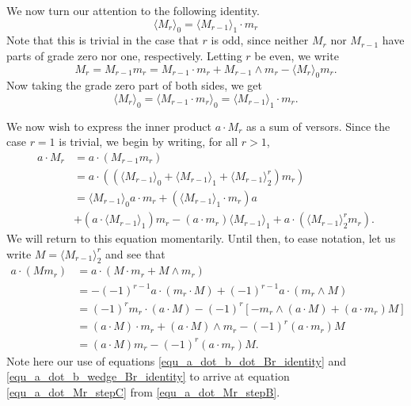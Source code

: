\documentclass{birkjour}
\theoremstyle{definition}
\theoremstyle{remark}
\numberwithin{equation}{section}
\begin{document}
We now turn our attention to the following identity.
\begin{equation}\label{equ_gr_zero_part_of_Mr}
\langle M_r\rangle_0 = \langle M_{r-1}\rangle_1\cdot m_r
\end{equation}
Note that this is trivial in the case that $r$ is odd, since neither $M_r$ nor $M_{r-1}$ have parts of grade zero nor one, respectively.
Letting $r$ be even, we write
\begin{equation*}
M_r = M_{r-1}m_r = M_{r-1}\cdot m_r + M_{r-1}\wedge m_r - \langle M_r\rangle_0 m_r.
\end{equation*}
Now taking the grade zero part of both sides, we get
\begin{equation*}
\langle M_r\rangle_0 = \langle M_{r-1}\cdot m_r\rangle_0 = \langle M_{r-1}\rangle_1\cdot m_r.
\end{equation*}

We now wish to express the inner product $a\cdot M_r$ as a sum of versors.
Since the case $r=1$ is trivial, we begin by writing, for all $r>1$,
\begin{align}
a\cdot M_r &= a\cdot (M_{r-1}m_r)\nonumber \\
 &= a\cdot((\langle M_{r-1}\rangle_0 + \langle M_{r-1}\rangle_1 + \langle M_{r-1}\rangle_2^r)m_r)\nonumber \\
 &= \langle M_{r-1}\rangle_0a\cdot m_r + (\langle M_{r-1}\rangle_1\cdot m_r)a\nonumber \\
 &+ (a\cdot\langle M_{r-1}\rangle_1)m_r - (a\cdot m_r)\langle M_{r-1}\rangle_1 + a\cdot(\langle M_{r-1}\rangle_2^rm_r).\label{equ_a_dot_Mr_stepA}
\end{align}
We will return to this equation momentarily.  Until then, to ease notation, let us write $M=\langle M_{r-1}\rangle_2^r$ and see that
\begin{align}
a\cdot(Mm_r)
 &= a\cdot(M\cdot m_r + M\wedge m_r)\nonumber \\
 &= -(-1)^{r-1}a\cdot(m_r\cdot M) + (-1)^{r-1}a\cdot(m_r\wedge M)\label{equ_a_dot_Mr_stepB} \\
 &= (-1)^rm_r\cdot(a\cdot M) - (-1)^r\left[-m_r\wedge(a\cdot M)+(a\cdot m_r)M\right]\label{equ_a_dot_Mr_stepC} \\
 &= (a\cdot M)\cdot m_r + (a\cdot M)\wedge m_r - (-1)^r(a\cdot m_r)M\nonumber \\
 &= (a\cdot M)m_r - (-1)^r(a\cdot m_r)M.\label{equ_a_dot_Mr_stepD}
\end{align}
Note here our use of equations \eqref{equ_a_dot_b_dot_Br_identity} and \eqref{equ_a_dot_b_wedge_Br_identity} to
arrive at equation \eqref{equ_a_dot_Mr_stepC} from \eqref{equ_a_dot_Mr_stepB}.
\end{document}

